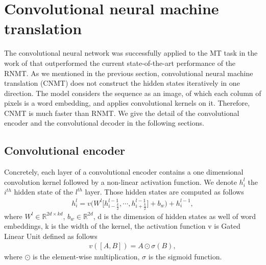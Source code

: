\section{Convolutional neural machine translation} \label{sec:cnn}
The convolutional neural network was successfully applied to the MT task in the work of \citet{Ghering17convolutional} that outperformed the current state-of-the-art performance of the RNMT. As we mentioned in the previous section, convolutional neural machine translation (CNMT) does not construct the hidden states iteratively in one direction. The model considers the sequence as an image, of which each column of pixels is a word embedding, and applies convolutional kernels on it. Therefore, CNMT is much faster than RNMT. We give the detail of the convolutional encoder and the convolutional decoder in the following sections.
\subsection{Convolutional encoder}
Concretely, each layer of a convolutional encoder contains a one dimensional convolution kernel followed by a non-linear activation function. We denote $h^l_i$ the $i^{th}$ hidden state of the $l^{th}$ layer. Those hidden states are computed as follows
\begin{equation}
\begin{array}{lcr}
h^l_i = v\bigg( W^l \big[h^{l-1}_{i-\frac{k}{2}}, \cdots, h^{l-1}_{i+\frac{k}{2}} \big] + b_w \bigg) + h^{l-1}_{i},
\end{array}
\end{equation}
where $W^l \in \mathbb{R}^{2d \times kd}$, $b_w \in \mathbb{R}^{2d}$, d is the dimension of hidden states as well of word embeddings, k is the width of the kernel, the activation function v is Gated Linear Unit \citep{Ghering17convolutional} defined as follows
\begin{equation}
\begin{array}{lcr}
v([A,B]) = A \odot \sigma(B),
\end{array}
\end{equation}
where $\odot$ is the element-wise multiplication, $\sigma$ is the sigmoid function.
